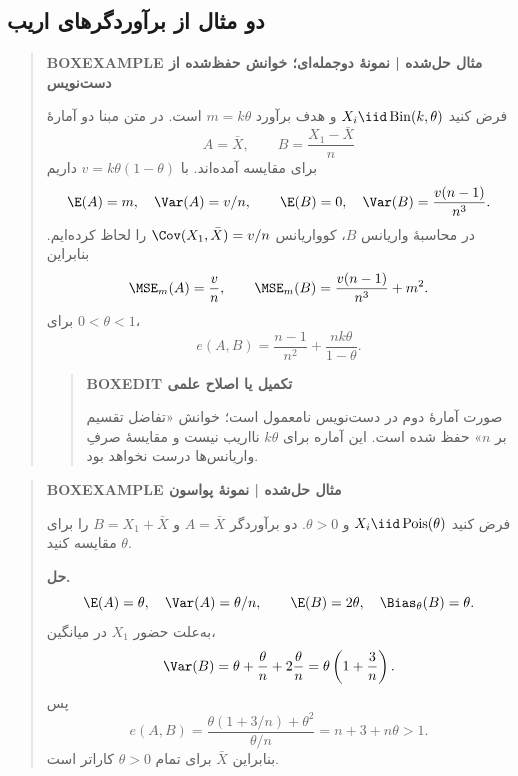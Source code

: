 \subsection{دو مثال از برآوردگرهای اریب}
\begin{quote}\textbf{BOXEXAMPLE مثال حل‌شده | نمونهٔ دوجمله‌ای؛ خوانش حفظ‌شده از دست‌نویس}\par 
فرض کنید $X_i\iid\operatorname{Bin}(k,\theta)$ و هدف برآورد $m=k\theta$ است. در متن مبنا دو آمارهٔ
\[A=\bar X,\qquad B=\frac{X_1-\bar X}{n}\]
برای مقایسه آمده‌اند. با $v=k\theta(1-\theta)$ داریم
\[
\E(A)=m,\quad\Var(A)=v/n,\qquad
\E(B)=0,\quad\Var(B)=\frac{v(n-1)}{n^3}.
\]
در محاسبهٔ واریانس $B$، کوواریانس $\Cov(X_1,\bar X)=v/n$ را لحاظ کرده‌ایم. بنابراین
\[
\MSE_m(A)=\frac vn,\qquad
\MSE_m(B)=\frac{v(n-1)}{n^3}+m^2.
\]
برای $0<\theta<1$،
\[
e(A,B)=\frac{n-1}{n^2}+\frac{nk\theta}{1-\theta}.
\]
\begin{quote}\textbf{BOXEDIT تکمیل یا اصلاح علمی}\par صورت آمارهٔ دوم در دست‌نویس نامعمول است؛ خوانش «تفاضل تقسیم بر $n$» حفظ شده است. این آماره برای $k\theta$ نااریب نیست و مقایسهٔ صرفِ واریانس‌ها درست نخواهد بود.\end{quote}
\end{quote}
\begin{quote}\textbf{BOXEXAMPLE مثال حل‌شده | نمونهٔ پواسون}\par 
فرض کنید $X_i\iid\operatorname{Pois}(\theta)$ و $\theta>0$. دو برآوردگر $A=\bar X$ و $B=X_1+\bar X$ را برای $\theta$ مقایسه کنید.
\par\textbf{حل.} 
\[
\E(A)=\theta,\quad\Var(A)=\theta/n,\qquad
\E(B)=2\theta,\quad\Bias_\theta(B)=\theta.
\]
به‌علت حضور $X_1$ در میانگین،
\[
\Var(B)=\theta+\frac\theta n+2\frac\theta n
=\theta\left(1+\frac3n\right).
\]
پس
\[
e(A,B)=\frac{\theta(1+3/n)+\theta^2}{\theta/n}
=n+3+n\theta>1.
\]
بنابراین $\bar X$ برای تمام $\theta>0$ کاراتر است.
\end{quote}
